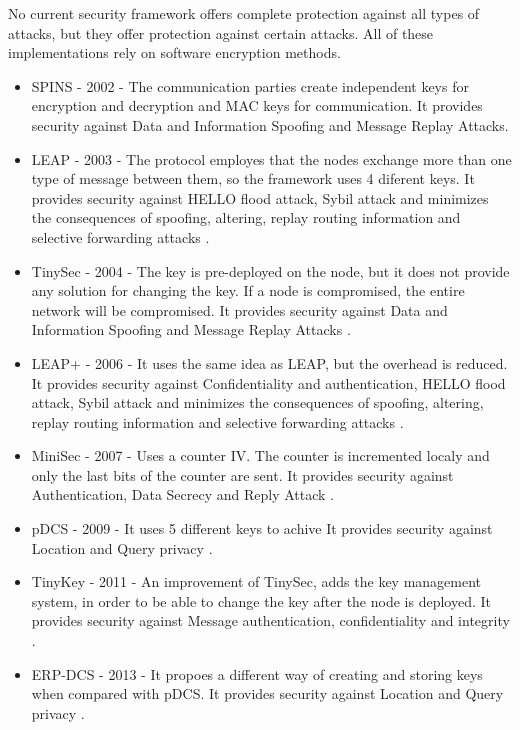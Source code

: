 No current security framework offers complete protection against all types of attacks, but they offer protection against certain attacks. All of these implementations rely on 
software encryption methods.
\begin{itemize}

\item SPINS - 2002 - The communication parties create independent keys for encryption and decryption
and MAC keys for communication. It provides security against Data and Information Spoofing and Message Replay Attacks\cite{perrig2002spins}.

\item LEAP - 2003 - The protocol employes that the nodes exchange more than one type of message between them, so the framework uses 4 diferent keys. It provides security against HELLO flood attack, Sybil attack and minimizes the consequences of spoofing, altering, replay routing information and selective forwarding attacks \cite{zhu2006leap+}.

\item TinySec - 2004 - The key is pre-deployed on the node, but it does not provide any solution for changing the key. If a node is compromised, the entire network will be compromised. It provides security against Data and Information Spoofing and Message Replay Attacks \cite{karlof2004tinysec}.

\item LEAP+ - 2006 - It uses the same idea as LEAP, but the overhead is reduced. It provides security against Confidentiality and authentication, HELLO flood attack, Sybil attack and minimizes the consequences of spoofing, altering, replay routing information and selective forwarding attacks \cite{zhu2006leap+}.
 
\item MiniSec - 2007 - Uses a counter IV. The counter is incremented localy and only the last bits of the counter are sent. It provides security against Authentication, Data Secrecy and Reply Attack \cite{luk2007minisec}.

\item pDCS - 2009 - It uses 5 different keys to achive  It provides security against Location and Query privacy \cite{shao2009pdcs}.

\item TinyKey - 2011 - An improvement of TinySec, adds the key management system, in order to be able to change the key after the node is deployed. It provides security against Message authentication, confidentiality and integrity \cite{doriguzzi2011tinykey}.

\item ERP-DCS - 2013 - It propoes a different way of creating and storing keys when compared with pDCS. It provides security against Location and Query privacy \cite{huang2013efficient}.

\end{itemize}
